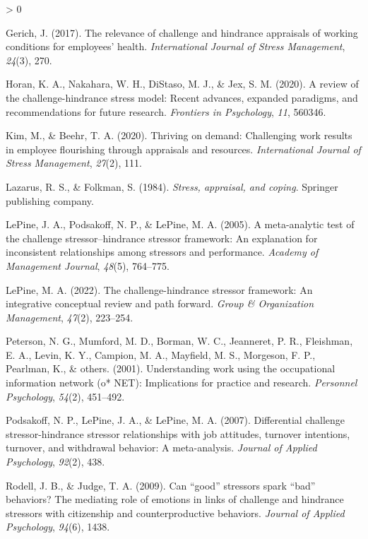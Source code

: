 \documentclass[
  english,
  man]{apa6}
\newlength{\cslhangindent}
\newenvironment{CSLReferences}[2] %
 {%
  \setlength{\parindent}{0pt}
  \ifodd #1 \everypar{\setlength{\hangindent}{\cslhangindent}}\ignorespaces\fi
  \ifnum #2 > 0
  \setlength{\parskip}{#2\baselineskip}
  \fi
 }%
 {}
\begin{document}
\begin{CSLReferences}{1}{0}
\leavevmode\hypertarget{ref-gerich2017relevance}{}%
Gerich, J. (2017). The relevance of challenge and hindrance appraisals of working conditions for employees' health. \emph{International Journal of Stress Management}, \emph{24}(3), 270.

\leavevmode\hypertarget{ref-horan2020review}{}%
Horan, K. A., Nakahara, W. H., DiStaso, M. J., \& Jex, S. M. (2020). A review of the challenge-hindrance stress model: Recent advances, expanded paradigms, and recommendations for future research. \emph{Frontiers in Psychology}, \emph{11}, 560346.

\leavevmode\hypertarget{ref-kim2020thriving}{}%
Kim, M., \& Beehr, T. A. (2020). Thriving on demand: Challenging work results in employee flourishing through appraisals and resources. \emph{International Journal of Stress Management}, \emph{27}(2), 111.

\leavevmode\hypertarget{ref-lazarus1984stress}{}%
Lazarus, R. S., \& Folkman, S. (1984). \emph{Stress, appraisal, and coping}. Springer publishing company.

\leavevmode\hypertarget{ref-lepine2005meta}{}%
LePine, J. A., Podsakoff, N. P., \& LePine, M. A. (2005). A meta-analytic test of the challenge stressor--hindrance stressor framework: An explanation for inconsistent relationships among stressors and performance. \emph{Academy of Management Journal}, \emph{48}(5), 764--775.

\leavevmode\hypertarget{ref-lepine2022challenge}{}%
LePine, M. A. (2022). The challenge-hindrance stressor framework: An integrative conceptual review and path forward. \emph{Group \& Organization Management}, \emph{47}(2), 223--254.

\leavevmode\hypertarget{ref-peterson2001understanding}{}%
Peterson, N. G., Mumford, M. D., Borman, W. C., Jeanneret, P. R., Fleishman, E. A., Levin, K. Y., Campion, M. A., Mayfield, M. S., Morgeson, F. P., Pearlman, K., \& others. (2001). Understanding work using the occupational information network (o* NET): Implications for practice and research. \emph{Personnel Psychology}, \emph{54}(2), 451--492.

\leavevmode\hypertarget{ref-podsakoff2007differential}{}%
Podsakoff, N. P., LePine, J. A., \& LePine, M. A. (2007). Differential challenge stressor-hindrance stressor relationships with job attitudes, turnover intentions, turnover, and withdrawal behavior: A meta-analysis. \emph{Journal of Applied Psychology}, \emph{92}(2), 438.

\leavevmode\hypertarget{ref-rodell2009can}{}%
Rodell, J. B., \& Judge, T. A. (2009). Can {``good''} stressors spark {``bad''} behaviors? The mediating role of emotions in links of challenge and hindrance stressors with citizenship and counterproductive behaviors. \emph{Journal of Applied Psychology}, \emph{94}(6), 1438.


\end{CSLReferences}
\end{document}
